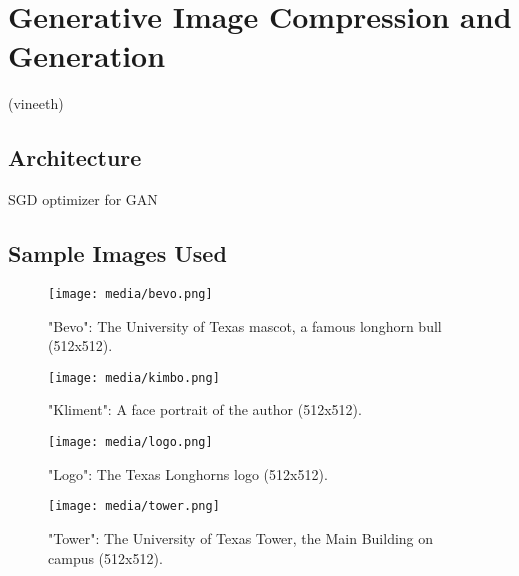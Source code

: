 \section{Generative Image Compression and Generation}

(vineeth)

\subsection{Architecture}

SGD optimizer for GAN

\subsection{Sample Images Used}

\begin{figure}[H]
	\begin{center}
	\texttt{[image: media/bevo.png]}
	\end{center}
	\caption[Input Image 1: Bevo]{"Bevo": The University of Texas mascot, a famous longhorn bull (512x512).}
	\end{figure}

\begin{figure}[H]
    \begin{center}
    \texttt{[image: media/kimbo.png]}
    \end{center}
    \caption[Input Image 2: Kliment]{"Kliment": A face portrait of the author (512x512).}
    \end{figure}

\begin{figure}[H]
    \begin{center}
    \texttt{[image: media/logo.png]}
    \end{center}
    \caption[Input Image 3: UT Logo]{"Logo": The Texas Longhorns logo (512x512).}
    \end{figure}

\begin{figure}[H]
        \begin{center}
        \texttt{[image: media/tower.png]}
        \end{center}
        \caption[Input Image 4: UT Tower]{"Tower": The University of Texas Tower, the Main Building on campus (512x512).}
        \end{figure}



